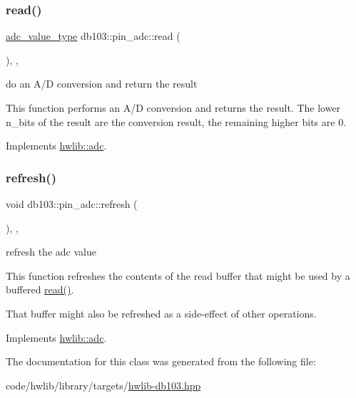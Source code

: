 \subsubsection{\texorpdfstring{read()}{read()}}
{\footnotesize\ttfamily \hyperlink{classhwlib_1_1adc_a1faacac0cc2f78e90652b17250cbe159}{adc\+\_\+value\+\_\+type} db103\+::pin\+\_\+adc\+::read (\begin{DoxyParamCaption}{ }\end{DoxyParamCaption})\hspace{0.3cm}{\ttfamily [inline]}, {\ttfamily [override]}, {\ttfamily [virtual]}}

do an A/D conversion and return the result

This function performs an A/D conversion and returns the result. The lower n\+\_\+bits of the result are the conversion result, the remaining higher bits are 0. 

Implements \hyperlink{classhwlib_1_1adc_ac39b506d3ae4eec08caa5aa7e69ab2fb}{hwlib\+::adc}.

\mbox{\label{classdb103_1_1pin__adc_aff62b5768df51a17f01d416002586e86}} 
\subsubsection{\texorpdfstring{refresh()}{refresh()}}
{\footnotesize\ttfamily void db103\+::pin\+\_\+adc\+::refresh (\begin{DoxyParamCaption}{ }\end{DoxyParamCaption})\hspace{0.3cm}{\ttfamily [inline]}, {\ttfamily [override]}, {\ttfamily [virtual]}}

refresh the adc value

This function refreshes the contents of the read buffer that might be used by a buffered \hyperlink{classdb103_1_1pin__adc_a2eca8e0a04be08ab585325d27ff93d64}{read()}.

That buffer might also be refreshed as a side-\/effect of other operations. 

Implements \hyperlink{classhwlib_1_1adc_a5484571b18d647ec78ba97e94c7ed836}{hwlib\+::adc}.



The documentation for this class was generated from the following file\+:\begin{DoxyCompactItemize}
\item 
code/hwlib/library/targets/\hyperlink{hwlib-db103_8hpp}{hwlib-\/db103.\+hpp}\end{DoxyCompactItemize}
